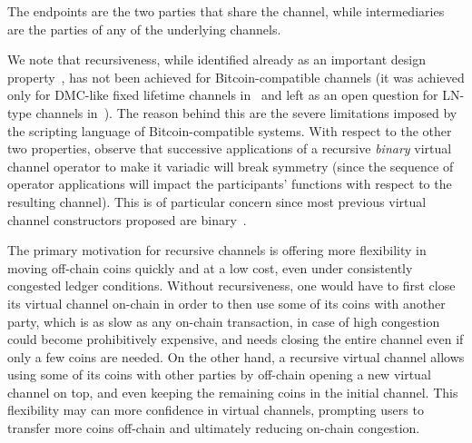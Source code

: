 The endpoints are the two parties that share the channel, while intermediaries are
the parties of any of the underlying channels.

We note that recursiveness, while identified already as an important design
property~\cite{DBLP:conf/ccs/DziembowskiFH18}, has not been achieved for Bitcoin-compatible channels
(it was achieved only for DMC-like fixed lifetime channels in~\cite{10.1007/978-3-030-65411-5_18} and left as an open question for LN-type channels in~\cite{9519487}).
The reason behind this are the severe limitations imposed by the scripting language of Bitcoin-compatible systems.
With respect to the other two properties, observe that successive applications
of a recursive {\em binary} virtual channel operator to make it variadic will
break symmetry (since the sequence of operator applications will impact the
participants' functions with respect to the resulting channel). This is of
particular concern since most previous virtual channel constructors proposed are
binary~\cite{DBLP:conf/ccs/DziembowskiFH18,9519487,10.1007/978-3-030-65411-5_18}.

The primary motivation for recursive channels is offering more flexibility in
moving off-chain coins quickly and at a low cost, even under consistently
congested ledger conditions. Without recursiveness, one would have to first
close its virtual channel on-chain in order to then use some of its coins with
another party, which is as slow as any on-chain transaction, in case of high
congestion could become prohibitively expensive, and needs closing the entire
channel even if only a few coins are needed. On the other hand, a recursive
virtual channel allows using some of its coins with other parties by off-chain
opening a new virtual channel on top, and even keeping the remaining coins in
the initial channel. This flexibility may can more confidence in virtual
channels, prompting users to transfer more coins off-chain and ultimately
reducing on-chain congestion.

